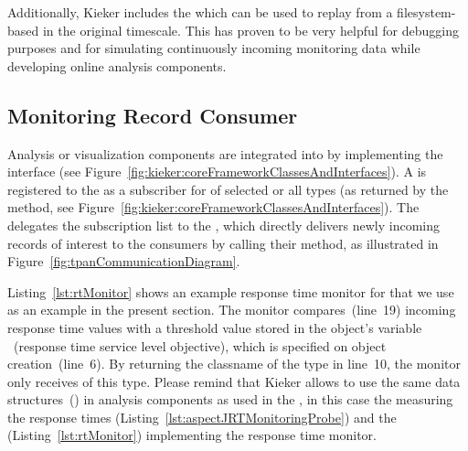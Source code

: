 Additionally, Kieker includes the \MonitoringLogReader{}  %
which can be used to replay \MonitoringRecords{} from a filesystem-based %
\MonitoringLog{} in the original timescale. This has proven to be very helpful for debugging purposes and for simulating %
continuously incoming monitoring data while developing online analysis components. %
% 
\subsection{Monitoring Record Consumer}
% 
% 
\noindent Analysis or visualization components are integrated into \KiekerTpan{} %
by implementing the  interface (see Figure~\ref{fig:kieker:coreFrameworkClassesAndInterfaces}). %
A \MonitoringRecordConsumer{} is registered to the \TpanInstance{} as a subscriber
for \MonitoringRecords{} of selected or all \MonitoringRecord{} types %
(as returned by the  method, see Figure~\ref{fig:kieker:coreFrameworkClassesAndInterfaces}). %
The \TpanInstance{} delegates the subscription list to the \MonitoringLogReader{},
which directly delivers newly incoming records of interest to the consumers by calling their
 method, as illustrated in %
Figure~\ref{fig:tpanCommunicationDiagram}. %

Listing~\ref{lst:rtMonitor} shows an example response time monitor for %
 that we use as an  example in the present section. %
The monitor compares~(line~19) incoming response time values  with a threshold value %
stored in the object's variable ~(response time service level objective), %
which is specified on object creation~(line~6). %
By returning the classname of the \MonitoringRecord{} type  %
in line~10, the monitor only receives \MonitoringRecords{} of this type. %
Please remind that Kieker allows to use
the same data structures~(\MonitoringRecords{}) in analysis components as used in the %
\MonitoringProbes{}, in this case the \MonitoringProbe{} measuring the response times %
(Listing~\ref{lst:aspectJRTMonitoringProbe}) and the \MonitoringRecordConsumer{} %
(Listing~\ref{lst:rtMonitor}) implementing the response time monitor.


